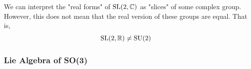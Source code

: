     \begin{center}
    \end{center}
    We can interpret the "real forms" of $\operatorname{SL}(2, \mathbb{C})$ as "slices" of some complex group. However, this does not mean that the real version of these groups are equal. That is, 
    \begin{equation}
      \operatorname{SL}(2, \mathbb{R}) \neq \text{SU}(2)
    \end{equation}

  \subsubsection{Lie Algebra of SO(3)}


